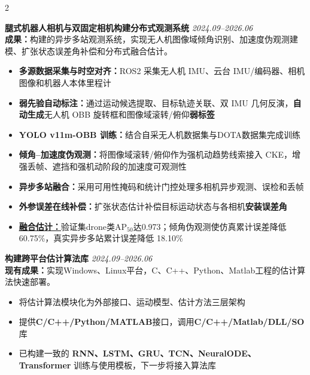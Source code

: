 \documentclass[10pt,A4]{article}
\begin{document}
\begin{paracol}{2}
\begin{rightcolumn}
\vspace{1.5em}

\noindent
\large\textbf{腿式机器人相机与双固定相机构建分布式观测系统} \normalsize \hfill \textit{2024.09--2026.06}\\[4pt]
\textbf{成果：}构建的异步多站观测系统，实现无人机图像域倾角识别、加速度伪观测建模、扩张状态误差角补偿和分布式融合估计。\\[-4pt]
\begin{itemize}
    \item \textbf{多源数据采集与时空对齐：}ROS2 采集无人机 IMU、云台 IMU/编码器、相机图像和机器人本体里程计
    \item \textbf{弱先验自动标注：}通过运动候选提取、目标轨迹关联、双 IMU 几何反演，\textbf{自动生成}无人机 OBB 旋转框和图像域滚转/俯仰\textbf{弱标签}
    \item \textbf{YOLO v11m-OBB 训练：}结合自采无人机数据集与DOTA数据集完成训练
    \item \textbf{倾角--加速度伪观测：}将图像域滚转/俯仰作为强机动趋势线索接入 CKE，增强丢帧、遮挡和强机动阶段的加速度可观测性
    \item \textbf{异步多站融合：}采用可用性掩码和统计门控处理多相机异步观测、误检和丢帧
    \item \textbf{外参误差在线补偿：}扩张状态估计补偿目标运动状态与各相机\textbf{安装误差角}
    \item \href{https://www.bilibili.com/video/BV1SnRQBwEFK}{\underline{\textbf{融合估计\;\raisebox{-0.1ex}{\faExternalLink}：}}}验证集drone类AP$_{50}$达0.973；倾角伪观测使仿真累计误差降低 60.75\%，真实异步多站累计误差降低 18.10\%
\end{itemize}

\vspace{1.5em}

\noindent
\large\textbf{构建跨平台估计算法库} \normalsize \hfill \textit{2024.09--2026.06}\\[4pt]
\textbf{现有成果：}实现Windows、Linux平台，C、C++、Python、Matlab工程的估计算法快速部署。\\[-4pt]
\begin{itemize}
    \item 将估计算法模块化为外部接口、运动模型、估计方法三层架构
    \item 提供\textbf{C/C++/Python/MATLAB}接口，调用\textbf{C/C++/Matlab/DLL/SO}库
    \item 已构建一致的 \textbf{RNN、LSTM、GRU、TCN、NeuralODE、Transformer} 训练与使用模板，下一步将接入算法库
\end{itemize}


\end{rightcolumn}
\end{paracol}
\end{document}
